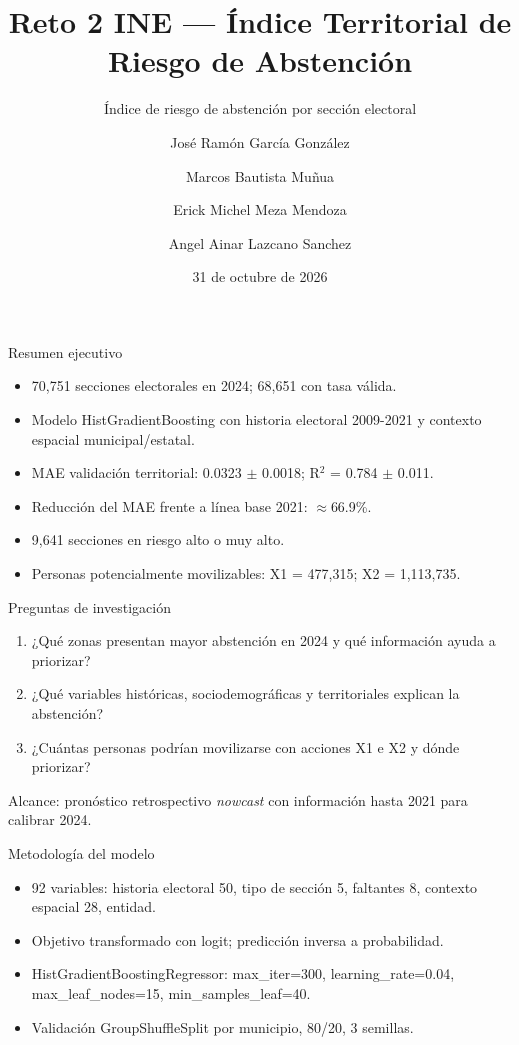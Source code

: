 \documentclass[aspectratio=169]{beamer}
\title{Reto 2 INE — Índice Territorial de Riesgo de Abstención}
\subtitle{Índice de riesgo de abstención por sección electoral}
\author{José Ramón García González \and Marcos Bautista Muñua \and Erick Michel Meza Mendoza \and Angel Ainar Lazcano Sanchez}
\institute{INE}
\date{31 de octubre de 2026}
\begin{document}
\maketitle

\begin{frame}{Resumen ejecutivo}
\begin{itemize}
\item 70,751 secciones electorales en 2024; 68,651 con tasa válida.
\item Modelo HistGradientBoosting con historia electoral 2009-2021 y contexto espacial municipal/estatal.
\item MAE validación territorial: 0.0323 $\pm$ 0.0018; R$^2$ = 0.784 $\pm$ 0.011.
\item Reducción del MAE frente a línea base 2021: $\approx$66.9\%.
\item 9,641 secciones en riesgo alto o muy alto.
\item Personas potencialmente movilizables: X1 = 477,315; X2 = 1,113,735.
\end{itemize}
\end{frame}

\begin{frame}{Preguntas de investigación}
\begin{enumerate}
\item ¿Qué zonas presentan mayor abstención en 2024 y qué información ayuda a priorizar?
\item ¿Qué variables históricas, sociodemográficas y territoriales explican la abstención?
\item ¿Cuántas personas podrían movilizarse con acciones X1 e X2 y dónde priorizar?
\end{enumerate}
Alcance: pronóstico retrospectivo \textit{nowcast} con información hasta 2021 para calibrar 2024.
\end{frame}

\begin{frame}{Metodología del modelo}
\begin{itemize}
\item 92 variables: historia electoral 50, tipo de sección 5, faltantes 8, contexto espacial 28, entidad.
\item Objetivo transformado con logit; predicción inversa a probabilidad.
\item HistGradientBoostingRegressor: max\_iter=300, learning\_rate=0.04, max\_leaf\_nodes=15, min\_samples\_leaf=40.
\item Validación GroupShuffleSplit por municipio, 80/20, 3 semillas.
\end{itemize}
\end{frame}
\end{document}
